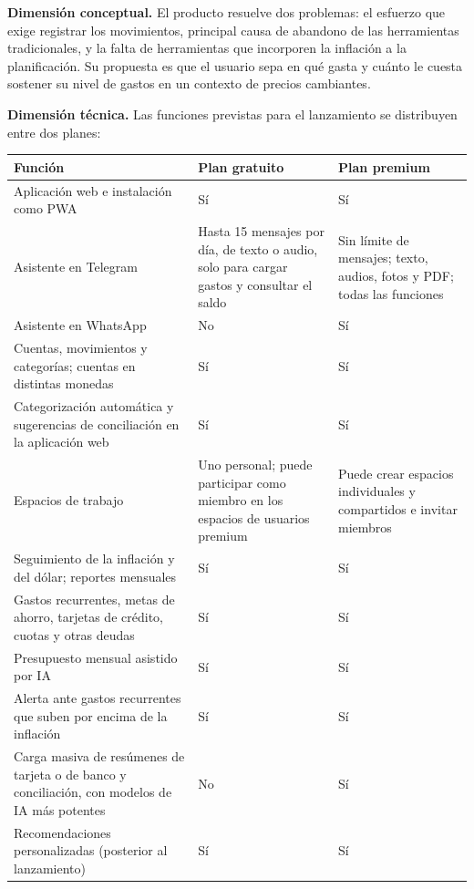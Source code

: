 \textbf{Dimensión conceptual.} El producto resuelve dos problemas: el
esfuerzo que exige registrar los movimientos, principal causa de
abandono de las herramientas tradicionales, y la falta de herramientas
que incorporen la inflación a la planificación. Su propuesta es que el
usuario sepa en qué gasta y cuánto le cuesta sostener su nivel de gastos
en un contexto de precios cambiantes.

\textbf{Dimensión técnica.} Las funciones previstas para el lanzamiento
se distribuyen entre dos planes:

{\def\LTcaptype{none} %
\begin{longtable}[]{@{}
  >{\raggedright\arraybackslash}p{}
  >{\raggedright\arraybackslash}p{}
  >{\raggedright\arraybackslash}p{}@{}}
\toprule\noalign{}
\begin{minipage}[b]{\linewidth}\raggedright
Función
\end{minipage} & \begin{minipage}[b]{\linewidth}\raggedright
Plan gratuito
\end{minipage} & \begin{minipage}[b]{\linewidth}\raggedright
Plan premium
\end{minipage} \\
\midrule\noalign{}
\endhead
\bottomrule\noalign{}
\endlastfoot
Aplicación web e instalación como PWA & Sí & Sí \\
Asistente en Telegram & Hasta 15 mensajes por día, de texto o audio,
solo para cargar gastos y consultar el saldo & Sin límite de mensajes;
texto, audios, fotos y PDF; todas las funciones \\
Asistente en WhatsApp & No & Sí \\
Cuentas, movimientos y categorías; cuentas en distintas monedas & Sí &
Sí \\
Categorización automática y sugerencias de conciliación en la aplicación
web & Sí & Sí \\
Espacios de trabajo & Uno personal; puede participar como miembro en los
espacios de usuarios premium & Puede crear espacios individuales y
compartidos e invitar miembros \\
Seguimiento de la inflación y del dólar; reportes mensuales & Sí & Sí \\
Gastos recurrentes, metas de ahorro, tarjetas de crédito, cuotas y otras
deudas & Sí & Sí \\
Presupuesto mensual asistido por IA & Sí & Sí \\
Alerta ante gastos recurrentes que suben por encima de la inflación & Sí
& Sí \\
Carga masiva de resúmenes de tarjeta o de banco y conciliación, con
modelos de IA más potentes & No & Sí \\
Recomendaciones personalizadas (posterior al lanzamiento) & Sí & Sí \\
\end{longtable}
}

